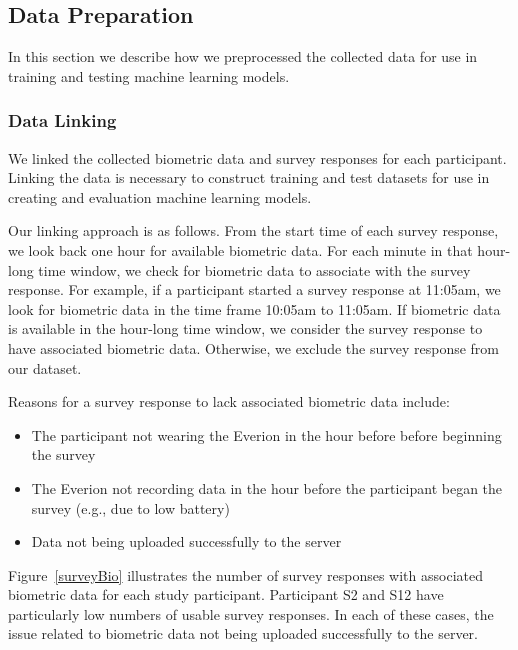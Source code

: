
\subsection{Data Preparation}

In this section we describe how we preprocessed the collected data for use in training and testing machine learning models.

\subsubsection{Data Linking}

We linked the collected biometric data and survey responses for each participant. Linking the data is necessary to construct training and test datasets for use in creating and evaluation machine learning models.

Our linking approach is as follows. From the start time of each survey response, we look back one hour for available biometric data. For each minute in that hour-long time window, we check for biometric data to associate with the survey response. For example, if a participant started a survey response at 11:05am, we look for biometric data in the time frame 10:05am to 11:05am. If biometric data is available in the hour-long time window, we consider the survey response to have associated biometric data. Otherwise, we exclude the survey response from our dataset.

Reasons for a survey response to lack associated biometric data include:
\begin{itemize}
\item The participant not wearing the Everion in the hour before before beginning the survey
\item The Everion not recording data in the hour before the participant began the survey (e.g., due to low battery)
\item Data not being uploaded successfully to the server
\end{itemize}

Figure~\ref{surveyBio} illustrates the number of survey responses with associated biometric data for each study participant. Participant S2 and S12 have particularly low numbers of usable survey responses. In each of these cases, the issue related to biometric data not being uploaded successfully to the server.


